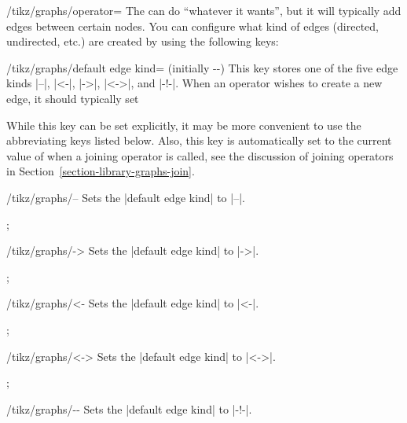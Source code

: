 \begin{key}{/tikz/graphs/operator=}
    The  can do ``whatever it wants'', but it will typically add
    edges between certain nodes. You can configure what kind of edges
    (directed, undirected, etc.) are created by using the following keys:
    \begin{key}{/tikz/graphs/default edge kind= (initially -\/-)}
        This key stores one of the five edge kinds |--|, |<-|, |->|, |<->|, and
        |-!-|. When an operator wishes to create a new edge, it should
        typically set
\begin{codeexample}
\end{codeexample}
        While this key can be set explicitly, it may be more convenient to use
        the abbreviating keys listed below. Also, this key is automatically set
        to the current value of  when a joining
        operator is called, see the discussion of joining operators in
        Section~\ref{section-library-graphs-join}.
    \end{key}
    \begin{key}{/tikz/graphs/--}
        Sets the |default edge kind| to |--|.
\begin{codeexample}[preamble={\usetikzlibrary{graphs.standard}}]
\tikz {};
\end{codeexample}
    \end{key}
    \begin{key}{/tikz/graphs/->}
        Sets the |default edge kind| to |->|.
\begin{codeexample}[preamble={\usetikzlibrary{graphs.standard}}]
\tikz {};
\end{codeexample}
    \end{key}
    \begin{key}{/tikz/graphs/<-}
        Sets the |default edge kind| to |<-|.
\begin{codeexample}[preamble={\usetikzlibrary{graphs.standard}}]
\tikz {};
\end{codeexample}
    \end{key}
    \begin{key}{/tikz/graphs/<->}
        Sets the |default edge kind| to |<->|.
\begin{codeexample}[preamble={\usetikzlibrary{graphs.standard}}]
\tikz {};
\end{codeexample}
    \end{key}
    \begin{key}{/tikz/graphs/-\protect\exclamationmarktext-}
        Sets the |default edge kind| to |-!-|.
    \end{key}


\end{key}
